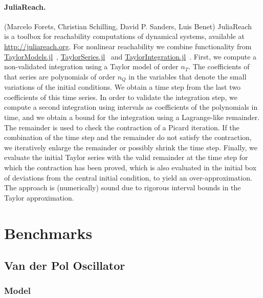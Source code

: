 \documentclass[EPiC]{easychair}
\begin{document}
\paragraph{JuliaReach.} (Marcelo Forets, Christian Schilling, David P. Sanders, Luis Benet) JuliaReach~\cite{BogomolovFFPS19} is a toolbox for reachability computations of dynamical systems, available at \url{http://juliareach.org}. For nonlinear reachability we combine functionality from \href{https://github.com/JuliaIntervals/TaylorModels.jl}{TaylorModels.jl}~\cite{TaylorModels.jl}, \href{https://github.com/JuliaDiff/TaylorSeries.jl}{TaylorSeries.jl}~\cite{TaylorSeries.jl} and \href{https://github.com/PerezHz/TaylorIntegration.jl}{TaylorIntegration.jl}~\cite{TaylorIntegration.jl}. First, we compute a non-validated integration using a Taylor model of order $n_T$. The coefficients of that series are polynomials of order $n_Q$ in the variables that denote the small variations of the initial conditions. We obtain a time step from the last two coefficients of this time series. In order to validate the integration step, we compute a second integration using intervals as coefficients of the polynomials in time, and we obtain a bound for the integration using a Lagrange-like remainder. The remainder is used to check the contraction of a Picard iteration. If the combination of the time step and the remainder do not satisfy the contraction, we iteratively enlarge the remainder or possibly shrink the time step. Finally, we evaluate the initial Taylor series with the valid remainder at the time step for which the contraction has been proved, which is also evaluated in the initial box of deviations from the central initial condition, to yield an over-approximation. The approach is (numerically) sound due to rigorous interval bounds in the Taylor approximation.

\newpage

\section{Benchmarks}
\label{sect:benchmarks}

\subsection{Van der Pol Oscillator}

\subsubsection{Model}
\end{document}

